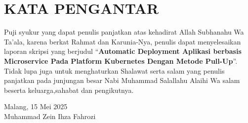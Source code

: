  {}
\chapter*{\uppercase{KATA PENGANTAR}}

Puji syukur yang dapat penulis panjatkan atas kehadirat Allah Subhanahu Wa
Ta’ala, karena berkat Rahmat dan Karunia-Nya, penulis dapat menyelesaikan
laporan skripsi yang berjudul “\textbf{Automatic Deployment Aplikasi berbasis Microservice Pada
    Platform Kubernetes Dengan Metode Pull-Up}”. Tidak lupa juga untuk menghaturkan
Shalawat serta salam yang penulis panjatkan pada junjungan besar Nabi
Muhammad Salallahu Alaihi Wa salam beserta keluarga,sahabat dan pengikutnya.


\begin{flushright}
    Malang, 15 Mei 2025 \\[3cm] %
    Muhammad Zein Ihza Fahrozi
\end{flushright}


\newpage
